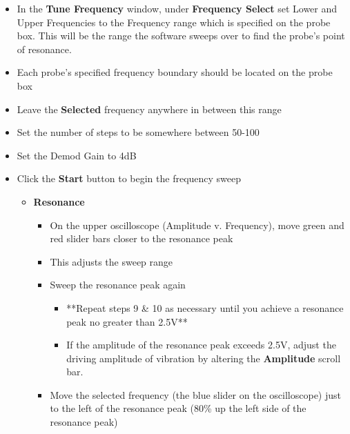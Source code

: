 \documentclass{../lab}
\begin{document}
\begin{itemize}
    \item In the \textbf{Tune Frequency} window, under \textbf{Frequency Select} set Lower and Upper Frequencies to the Frequency range which is specified on the probe box. This will be the range the software sweeps over to find the probe's point of resonance.
    
    \item Each probe's specified frequency boundary should be located on the probe box
    
    \item Leave the \textbf{Selected }frequency anywhere in between this range
    
    \item Set the number of steps to be somewhere between 50-100
    
    \item Set the Demod Gain to 4dB
    
    \item Click the \textbf{Start} button to begin the frequency sweep
    \begin{itemize}
        \item\textbf{Resonance}
        \begin{itemize}
            \item On the upper oscilloscope (Amplitude v. Frequency), move green and red slider bars closer to the resonance peak
            
            \item This adjusts the sweep range
            
            \item Sweep the resonance peak again
            \begin{itemize}
                \item **Repeat steps 9 \& 10 as necessary until you achieve a resonance peak no greater than 2.5V**
                
                \item If the amplitude of the resonance peak exceeds 2.5V, adjust the driving amplitude of vibration by altering the \textbf{Amplitude} scroll bar.
            \end{itemize}
            
            \item Move the selected frequency (the blue slider on the oscilloscope) just to the left of the resonance peak (80\% up the left side of the resonance peak)
            

\end{itemize}
\end{itemize}
\end{itemize}
\end{document}
